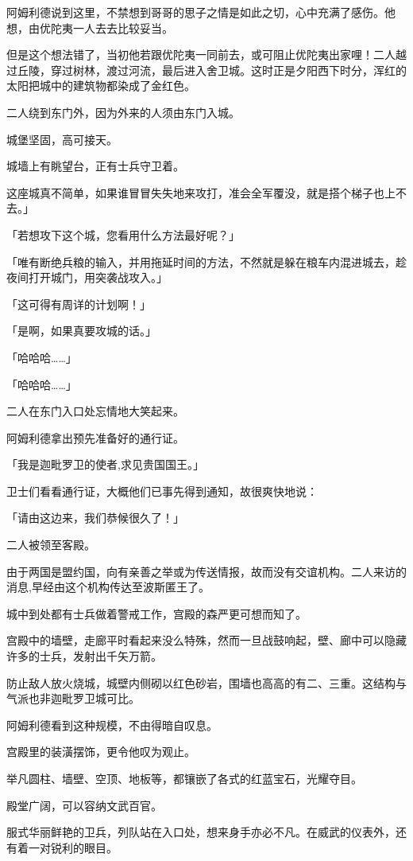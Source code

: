 \documentclass[twoside,openany]{book}
\begin{document}
阿姆利德说到这里，不禁想到哥哥的思子之情是如此之切，心中充满了感伤。他想，由优陀夷一人去去比较妥当。

但是这个想法错了，当初他若跟优陀夷一同前去，或可阻止优陀夷出家哩！二人越过丘陵，穿过树林，渡过河流，最后进入舍卫城。这时正是夕阳西下时分，浑红的太阳把城中的建筑物都染成了金红色。

二人绕到东门外，因为外来的人须由东门入城。

城堡坚固，高可接天。

城墙上有眺望台，正有士兵守卫着。

这座城真不简单，如果谁冒冒失失地来攻打，准会全军覆没，就是搭个梯子也上不去。」

「若想攻下这个城，您看用什么方法最好呢？」

「唯有断绝兵粮的输入，并用拖延时间的方法，不然就是躲在粮车内混进城去，趁夜间打开城门，用突袭战攻入。」

「这可得有周详的计划啊！」

「是啊，如果真要攻城的话。」

「哈哈哈……」

「哈哈哈……」

二人在东门入口处忘情地大笑起来。

阿姆利德拿出预先准备好的通行证。

「我是迦毗罗卫的使者,求见贵国国王。」

卫士们看看通行证，大概他们已事先得到通知，故很爽快地说：

「请由这边来，我们恭候很久了！」

二人被领至客殿。

由于两国是盟约国，向有亲善之举或为传送情报，故而没有交谊机构。二人来访的消息,早经由这个机构传达至波斯匿王了。

城中到处都有士兵做着警戒工作，宫殿的森严更可想而知了。

宫殿中的墙壁，走廊平时看起来没么特殊，然而一旦战鼓响起，壁、廊中可以隐藏许多的士兵，发射出千矢万箭。

防止敌人放火烧城，城壁内侧砌以红色砂岩，围墙也高高的有二、三重。这结构与气派也非迦毗罗卫城可比。

阿姆利德看到这种规模，不由得暗自叹息。

宫殿里的装潢摆饰，更令他叹为观止。

举凡圆柱、墙壁、空顶、地板等，都镶嵌了各式的红蓝宝石，光耀夺目。

殿堂广阔，可以容纳文武百官。

服式华丽鲜艳的卫兵，列队站在入口处，想来身手亦必不凡。在威武的仪表外，还有着一对锐利的眼目。
\end{document}
